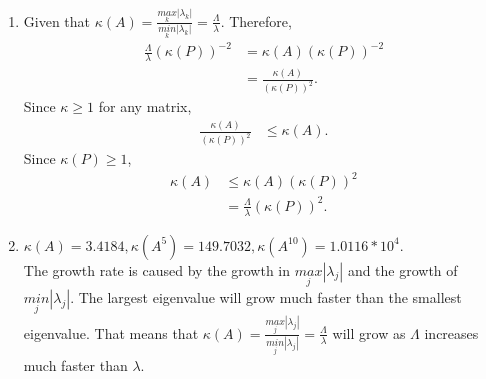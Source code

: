 \documentclass{article}
\begin{document}
\begin{enumerate}
    \item
    
    Given that $\kappa (A)=\frac{\underset{k}{max}|\lambda_k|}{\underset{k}{min}|\lambda_k|}=\frac{\Lambda}{\lambda}$. Therefore, 
    \begin{align*}
        \frac{\Lambda}{\lambda}(\kappa(P))^{-2} &= \kappa(A)(\kappa(P))^{-2}\\
        &= \frac{\kappa(A)}{(\kappa(P))^2}.
    \end{align*} Since $\kappa \geq1$ for any matrix,
    \begin{align*}
        \frac{\kappa(A)}{(\kappa(P))^2} &\leq \kappa(A).
    \end{align*} Since $\kappa(P)\geq1$,
    \begin{align*}
        \kappa(A)&\leq\kappa(A)(\kappa(P))^2\\
        &=\frac{\Lambda}{\lambda}(\kappa(P))^2.
    \end{align*}
    
    \item
    
    $\kappa(A)=3.4184, \kappa(A^5)=149.7032, \kappa(A^{10})=1.0116*10^4$.\\
    The growth rate is caused by the growth in $\underset{j}{max}|\lambda_j|$ and the  growth of $\underset{j}{min}|\lambda_j|$. The largest eigenvalue will grow much faster than the smallest eigenvalue. That means that $\kappa(A)=\frac{\underset{j}{max}|\lambda_j|}{\underset{j}{min}|\lambda_j|}=\frac{\Lambda}{\lambda}$ will grow as $\Lambda$ increases much faster than $\lambda$.
    
\end{enumerate}
\end{document}
